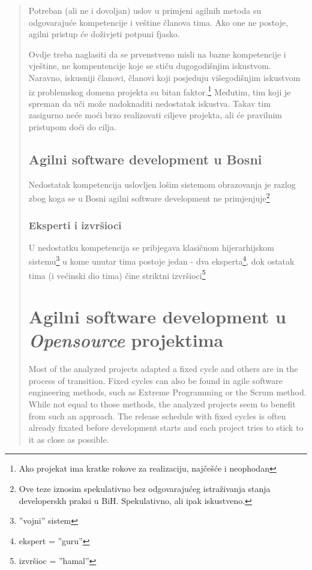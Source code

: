 \documentclass[lmodern, utf8, zavrsni]{fit}
\begin{document}
\begin{quote}
Potreban (ali ne i dovoljan) uslov u primjeni agilnih metoda su odgovarajuće kompetencije i veštine članova tima. Ako one ne postoje, agilni pristup će doživjeti potpuni fjasko.

Ovdje treba naglasiti da se prvenstveno misli na bazne kompetencije i vještine, ne kompentencije koje se stiču dugogodišnjim iskustvom. Naravno, iskusniji članovi, članovi koji posjeduju višegodišnjim iskustvom iz problemskog domena projekta su bitan faktor.\footnote{Ako projekat ima kratke rokove za realizaciju, najčešće i neophodan} Međutim, tim koji je spreman da uči može nadoknaditi nedostatak iskustva. Takav tim zasigurno neće moći brzo realizovati ciljeve projekta, ali će pravilnim pristupom doći do cilja.

\section{Agilni software development u Bosni}

Nedostatak kompetencija uslovljen lošim sistemom obrazovanja je razlog zbog koga se u Bosni agilni software development ne primjenjuje\footnote{Ove teze iznosim spekulativno bez odgovarajućeg istraživanja stanja developerskh praksi u BiH. Spekulativno, ali ipak iskustveno.}

\subsection{Eksperti i izvršioci}

U nedostatku kompetencija se pribjegava klasičnom hijerarhijskom sistemu\footnote{''vojni'' sistem} u kome unutar tima postoje jedan - dva eksperta\footnote{ekspert = ''guru''}, dok ostatak tima (i većinski dio tima) čine striktni izvršioci\footnote{izvršioc = ''hamal''}


\chapter{Agilni software development u \emph{Opensource} projektima}

Most of the analyzed projects adapted a fixed cycle and others are in the process of transition. Fixed cycles can also be found in agile software engineering methods, such as Extreme Programming or the Scrum method. While not equal to those methods, the analyzed projects seem to benefit from such an approach. The release schedule with fixed cycles is often already fixated before development starts and each project tries to stick to it as close as possible.\citep[str. 95]{Siegel2012}


\end{quote}
\end{document}
